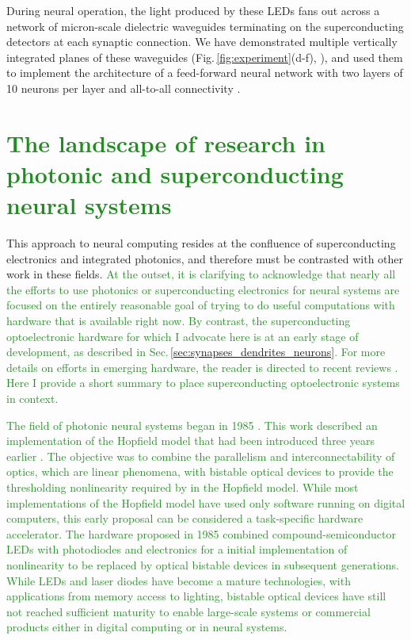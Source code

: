 \documentclass[twocolumn]{article}
\begin{document}
During neural operation, the light produced by these LEDs fans out across a network of micron-scale dielectric waveguides terminating on the superconducting detectors at each synaptic connection. We have demonstrated multiple vertically integrated planes of these waveguides (Fig.\,\ref{fig:experiment}(d-f), \cite{chbu2017}), and used them to implement the architecture of a feed-forward neural network with two layers of 10 neurons per layer and all-to-all connectivity \cite{chbu2018}.

\section{\label{sec:other_approaches}\textcolor{ForestGreen}{The landscape of research in photonic and superconducting neural systems}}
This approach to neural computing resides at the confluence of superconducting electronics and integrated photonics, and therefore must be contrasted with other work in these fields. \textcolor{ForestGreen}{At the outset, it is clarifying to acknowledge that nearly all the efforts to use photonics or superconducting electronics for neural systems are focused on the entirely reasonable goal of trying to do useful computations with hardware that is available right now. By contrast, the superconducting optoelectronic hardware for which I advocate here is at an early stage of development, as described in Sec.\,\ref{sec:synapses_dendrites_neurons}. For more details on efforts in emerging hardware, the reader is directed to recent reviews \cite{bexi2020,shta2021}. Here I provide a short summary to place superconducting optoelectronic systems in context.}

\textcolor{ForestGreen}{The field of photonic neural systems began in 1985 \cite{psfa1985,faps1985}. This work described an implementation of the Hopfield model that had been introduced three years earlier \cite{ho1982}. The objective was to combine the parallelism and interconnectability of optics, which are linear phenomena, with bistable optical devices to provide the thresholding nonlinearity required by in the Hopfield model. While most implementations of the Hopfield model have used only software running on digital computers, this early proposal can be considered a task-specific hardware accelerator. The hardware proposed in 1985 combined compound-semiconductor LEDs with photodiodes and electronics for a initial implementation of nonlinearity to be replaced by optical bistable devices in subsequent generations. While LEDs and laser diodes have become a mature technologies, with applications from memory access to lighting, bistable optical devices have still not reached sufficient maturity to enable large-scale systems or commercial products either in digital computing or in neural systems.}
\end{document}
